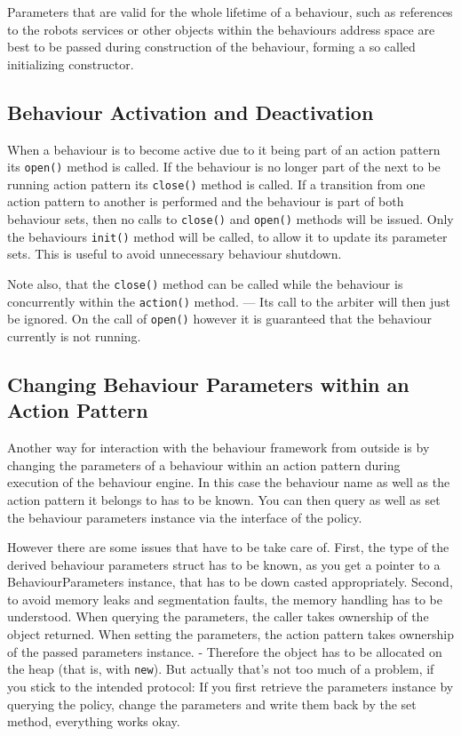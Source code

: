 Parameters that are valid for the whole lifetime of a behaviour, such
as references to the robots services or other objects within the
behaviours address space are best to be passed during construction
of the behaviour, forming a so called initializing constructor.

\subsection{Behaviour Activation and Deactivation}
\label{sec:active-inactive}

When a behaviour is to become active due to it being part of an action
pattern its {\tt open()} method is called. If the behaviour is no longer
part of the next to be running action pattern its {\tt close()} method is
called. If a transition from one action pattern to another is
performed and the behaviour is part of both behaviour sets, then no
calls to {\tt close()} and {\tt open()} methods will be issued. Only the
behaviours {\tt init()} method will be called, to allow it to update its
parameter sets. This is useful to avoid unnecessary behaviour
shutdown.

Note also, that the {\tt close()} method can be called while the behaviour
is concurrently within the {\tt action()} method. --- Its call to the
arbiter will then just be ignored. On the call of {\tt open()} however it
is guaranteed that the behaviour currently is not running.

\subsection{Changing Behaviour Parameters within an Action Pattern}
\label{SEC:DYNAMIC_PARAMETERS}

Another way for interaction with the behaviour framework from outside
is by changing the parameters of a behaviour within an action pattern
during execution of the behaviour engine. In this case the behaviour
name as well as the action pattern it belongs to has to be known. You
can then query as well as set the behaviour parameters instance via
the interface of the policy.

However there are some issues that have to be take care of. First, the
type of the derived behaviour parameters struct has to be known, as
you get a pointer to a BehaviourParameters instance, that has to be
down casted appropriately. Second, to avoid memory leaks and
segmentation faults, the memory handling has to be understood. When
querying the parameters, the caller takes ownership of the object
returned. When setting the parameters, the action pattern takes
ownership of the passed parameters instance. - Therefore the object
has to be allocated on the heap (that is, with {\tt new}). But
actually that's not too much of a problem, if you stick to the
intended protocol: 
If you first retrieve the parameters instance by querying the policy,
change the parameters and write them back by the set method,
everything works okay.

